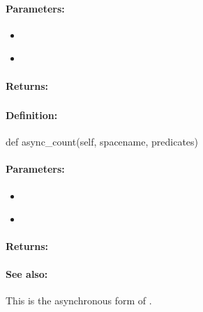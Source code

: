 \paragraph{Parameters:}
\begin{itemize}[noitemsep]
\item {}\\

\item {}\\

\end{itemize}

\paragraph{Returns:}


\pagebreak
\subsubsection{}
\label{api:python:async_count}


\paragraph{Definition:}
\begin{pythoncode}
def async_count(self, spacename, predicates)
\end{pythoncode}

\paragraph{Parameters:}
\begin{itemize}[noitemsep]
\item {}\\

\item {}\\

\end{itemize}

\paragraph{Returns:}


\paragraph{See also:}  This is the asynchronous form of .
